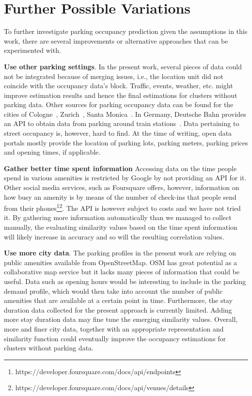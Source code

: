 	\section{Further Possible Variations}
	To further investigate parking occupancy prediction given the assumptions in this work, there are several improvements or alternative approaches that can be experimented with.
	
	\begin{romanlist}
		\item \textbf{Use other parking settings}.
		In the present work, several pieces of data could not be integrated because of merging issues, i.e., the location unit did not coincide with the occupancy data's block.
		Traffic, events, weather, etc. might improve estimation results and hence the final estimations for clusters without parking data.
		Other sources for parking occupancy data can be found for the cities of Cologne~\cite{cologne_data}, Zurich~\cite{zurich_data}, Santa Monica~\cite{santa_monica_data}.
		In Germany, Deutsche Bahn provides an API to obtain data from parking around train stations~\cite{dbbahn_data}.
		Data pertaining to street occupancy is, however, hard to find.
		At the time of writing, open data portals mostly provide the location of parking lots, parking meters, parking prices and opening times, if applicable.  
		
		\item \textbf{Gather better time spent information}
		Accessing data on the time people spend in various amenities is restricted by Google by not providing an API for it. Other social media services, such as Foursquare offers, however, information on how busy an amenity is by means of the number of check-ins that people send from their phones\footnote{https://developer.foursquare.com/docs/api/endpoints}\footnote{https://developer.foursquare.com/docs/api/venues/details}. The API is however subject to costs and we have not tried it. By gathering more information automatically than we managed to collect manually, the evaluating similarity values based on the time spent information will likely increase in accuracy and so will the resulting correlation values.  
		
		\item \textbf{Use more city data}.
		The parking profiles in the present work are relying on public amenities available from OpenStreetMap.
		OSM has great potential as a collaborative map service but it lacks many pieces of information that could be useful.
		Data such as opening hours would be interesting to include in the parking demand profile, which would then take into account the number of public amenities that are available at a certain point in time.
		Furthermore, the stay duration data collected for the present approach is currently limited.
		Adding more stay duration data may fine tune the emerging similarity values.
		Overall, more and finer city data, together with an appropriate representation and similarity function could eventually improve the occupancy estimations for clusters without parking data. 
		

\end{romanlist}
